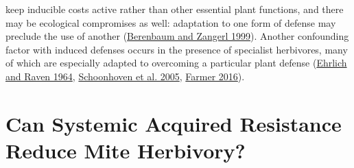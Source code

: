 \documentclass[12pt,final,CPage]{ufthesis}
\begin{document}
{keep inducible costs active rather than other essential plant functions, and there may be ecological compromises as well: adaptation to one form of defense may preclude the use of another (\protect\hyperlink{ref-Berenbaum1999}{Berenbaum and Zangerl 1999}). Another confounding factor with induced defenses occurs in the presence of specialist herbivores, many of which are especially adapted to overcoming a particular plant defense (\protect\hyperlink{ref-Ehrlich1964}{Ehrlich and Raven 1964}, \protect\hyperlink{ref-Schoonhoven2005}{Schoonhoven et al. 2005}, \protect\hyperlink{ref-Farmer2016}{Farmer 2016}).

  \hypertarget{litrev-sar}{%
  \section{Can Systemic Acquired Resistance Reduce Mite Herbivory?}\label{litrev-sar}}

}
\end{document}
